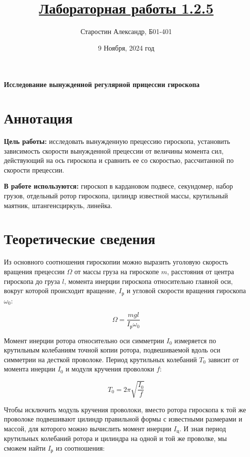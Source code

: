 \documentclass[a4paper]{article}
\title{\underline{Лабораторная работы 1.2.5}}
\author{Старостин Александр, Б01-401}
\date {9 Ноября, 2024 год}
\begin{document}
\maketitle
\newpage

\textbf{Исследование вынужденной регулярной прицессии гироскопа}

\section{Аннотация}
    \par \textbf{Цель работы:} исследовать вынужденную прецессию гироскопа, установить зависимость скорости вынужденной прецессии от величины момента сил, действующий на ось гироскопа и сравнить ее со скоростью, рассчитанной по скорости прецессии.\\

    \par \textbf{В работе используются:} гироскоп в кардановом подвесе, секундомер, набор грузов, отдельный ротор гироскопа, цилиндр известной массы, крутильный маятник, штангенсциркуль, линейка.


\section{Теоретические сведения}


Из основного соотношения гироскопии можно выразить уголовую скорость вращения прецессии $\Omega$ от массы груза на гироскопе $m$, расстояния от центра гироскопа до груза $l$, момента инерции гироскопа относительно главной оси, вокруг которой происходит вращение, $I_\text{р}$ и угловой скорости вращения гироскопа $\omega_0$:

\begin{equation}
	\Omega = \frac{mgl}{I_\text{р}\omega_0}
\end{equation}

Момент инерции ротора относительно оси симметрии $I_0$ измеряется по крутильным колебаниям точной копии ротора, подвешиваемой вдоль оси симметрии на десткой проволоке. Период крутильных колебаний $T_0$ зависит от момента инерции $I_0$ и модуля кручения проволоки $f$:

\begin{equation}
	T_0 = 2\pi\sqrt{\frac{I_0}{f}}
\end{equation}

Чтобы исключить модуль кручения проволоки, вместо ротора гироскопа к той же проволоке подвешивают цилиндр правильной формы с известными размерами и массой, для которого можно вычислить момент инерции $I_\text{ц}$. И зная период крутильных колебаний ротора и цилиндра на одной и той же проволке, мы сможем найти $I_\text{р}$ из соотношения:
\end{document}
